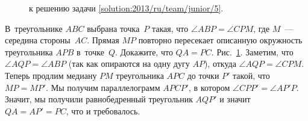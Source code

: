 \ifsolution
\begin{figure}\centering
    \caption{к решению задачи \ref{solution:2013/ru/team/junior/5}.}
    \label{fig:solution:2013/ru/team/junior/5}
\end{figure}
\fi %

\problem{}
В~треугольнике $ABC$ выбрана точка~$P$ такая, что $\angle ABP = \angle CPM$,
где $M$~--- середина стороны~$AC$.
Прямая $MP$ повторно пересекает описанную окружность треугольника $APB$
в~точке~$Q$.
Докажите, что $QA = PC$.
\solution
\label{solution:2013/ru/team/junior/5}
Рис.~\ref{fig:solution:2013/ru/team/junior/5}.
Заметим, что $\angle AQP = \angle ABP$ (так как опираются на одну дугу $AP$),
откуда $\angle AQP = \angle CPM$.
Теперь продлим медиану $PM$ треугольника $APC$ до точки $P'$ такой, что
$MP = MP'$.
Мы получим параллелограмм $APCP'$, в котором $\angle CPP' = \angle AP'P$.
Значит, мы получили равнобедренный треугольник $AQP'$ и значит $QA = AP' = PC$,
что и требовалось. 
\endproblem
